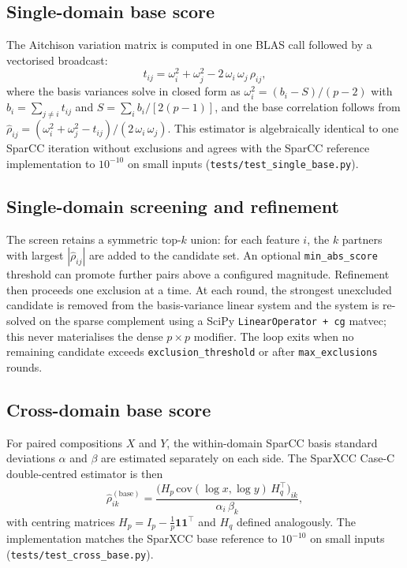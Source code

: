 \documentclass[unnumsec,webpdf,contemporary,large]{oup-authoring-template}
\newcommand{\codepath}[1]{\nolinkurl{#1}}
\theoremstyle{thmstyleone}
\theoremstyle{thmstyletwo}
\theoremstyle{thmstylethree}
\begin{document}
\subsection{Single-domain base score}\label{sec:single-base}

The Aitchison variation matrix is computed in one BLAS call followed by
a vectorised broadcast:
\begin{equation}
t_{ij} = \omega_i^2 + \omega_j^2 - 2\,\omega_i\,\omega_j\,\rho_{ij},
\label{eq:tmat}
\end{equation}
where the basis variances solve in closed form as
$\omega_i^2 = (b_i - S) / (p - 2)$ with $b_i = \sum_{j \ne i} t_{ij}$
and $S = \sum_i b_i / [2(p-1)]$, and the base correlation follows from
$\hat\rho_{ij} = (\omega_i^2 + \omega_j^2 - t_{ij}) / (2\,\omega_i\,\omega_j)$.
This estimator is algebraically identical to one SparCC iteration
without exclusions and agrees with the SparCC reference implementation
to $10^{-10}$ on small inputs (\codepath{tests/test_single_base.py}).

\subsection{Single-domain screening and refinement}\label{sec:single-refine}

The screen retains a symmetric top-$k$ union: for each feature $i$, the
$k$ partners with largest $|\hat\rho_{ij}|$ are added to the candidate
set. An optional \texttt{min\_abs\_score} threshold can promote further
pairs above a configured magnitude. Refinement then proceeds one
exclusion at a time. At each round, the strongest unexcluded candidate
is removed from the basis-variance linear system and the system is
re-solved on the sparse complement using a SciPy
\texttt{LinearOperator + cg} matvec; this never materialises the dense
$p \times p$ modifier. The loop exits when no remaining candidate
exceeds \texttt{exclusion\_threshold} or after
\texttt{max\_exclusions} rounds.

\subsection{Cross-domain base score}\label{sec:cross-base}

For paired compositions $X$ and $Y$, the within-domain SparCC basis
standard deviations $\alpha$ and $\beta$ are estimated separately on
each side. The SparXCC Case-C double-centred estimator is then
\begin{equation}
\hat\rho_{ik}^{(\text{base})} =
\frac{\bigl(H_p\,\mathrm{cov}(\log x, \log y)\,H_q^\top\bigr)_{ik}}
     {\alpha_i\,\beta_k},
\label{eq:cross-base}
\end{equation}
with centring matrices $H_p = I_p - \frac{1}{p}\mathbf{1}\mathbf{1}^\top$
and $H_q$ defined analogously. The implementation matches the SparXCC
base reference to $10^{-10}$ on small inputs
(\codepath{tests/test_cross_base.py}).
\end{document}
